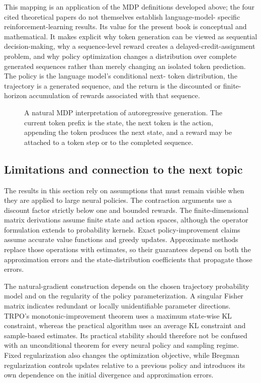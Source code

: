 This mapping is an application of the MDP definitions developed above; the
four cited theoretical papers do not themselves establish language-model-
specific reinforcement-learning results. Its value for the present book is
conceptual and mathematical. It makes explicit why token generation can be
viewed as sequential decision-making, why a sequence-level reward creates a
delayed-credit-assignment problem, and why policy optimization changes a
distribution over complete generated sequences rather than merely changing an
isolated token prediction. The policy is the language model's conditional next-
token distribution, the trajectory is a generated sequence, and the return is
the discounted or finite-horizon accumulation of rewards associated with that
sequence.

\begin{figure}[htbp]
    \centering
    \resizebox{\textwidth}{!}{}
    \caption{A natural MDP interpretation of autoregressive generation. The
    current token prefix is the state, the next token is the action, appending
    the token produces the next state, and a reward may be attached to a token
    step or to the completed sequence.}
    \label{fig:rl-language-model-mdp}
\end{figure}

\subsection{Limitations and connection to the next topic}
\label{subsec:rl-theory-limitations-next-topic}

The results in this section rely on assumptions that must remain visible when
they are applied to large neural policies. The contraction arguments use a
discount factor strictly below one and bounded rewards. The finite-dimensional
matrix derivations assume finite state and action spaces, although the
operator formulation extends to probability kernels. Exact policy-improvement
claims assume accurate value functions and greedy updates. Approximate methods
replace those operations with estimates, so their guarantees depend on both
the approximation errors and the state-distribution coefficients that
propagate those errors.

The natural-gradient construction depends on the chosen trajectory
probability model and on the regularity of the policy parameterization. A
singular Fisher matrix indicates redundant or locally unidentifiable parameter
directions. TRPO's monotonic-improvement theorem uses a maximum state-wise KL
constraint, whereas the practical algorithm uses an average KL constraint and
sample-based estimates. Its practical stability should therefore not be
confused with an unconditional theorem for every neural policy and sampling
regime. Fixed regularization also changes the optimization objective, while
Bregman regularization controls updates relative to a previous policy and
introduces its own dependence on the initial divergence and approximation
errors.

